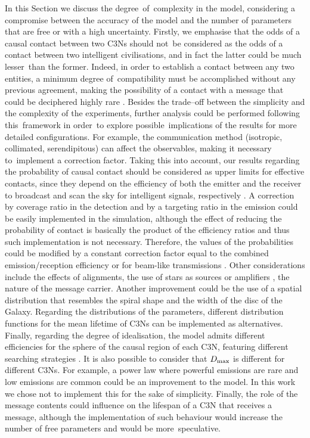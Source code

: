 \documentclass[crop]{CSLB}
\newcommand{\ceti}{C3N}
\newcommand{\cetis}{C3Ns}
\begin{document}
In this Section we discuss the degree of complexity in the model, considering a compromise between the accuracy of the
model and the number of parameters that are free or with a high uncertainty.
%
Firstly, we emphasise that the odds of a causal contact between two \cetis{} should not be considered as the odds of a
contact between two intelligent civilisations, and in fact the latter could be much lesser than the former.
%
Indeed, in order to establish a contact between any two entities, a minimum degree of compatibility must be accomplished
without any previous agreement, making the possibility of a contact with a message that could be deciphered highly rare
\citep[see e.g. ][]{forgan_collimated_2014}.
%
Besides the trade--off between the simplicity and the complexity of the experiments, further analysis could be performed
following this framework in order to explore possible implications of the results for more detailed configurations.
%
For example, the communication method (isotropic, collimated, serendipitous) can affect the observables, making it
necessary to implement a correction factor.
%
Taking this into account, our results regarding the probability of causal contact should be considered as upper limits
for effective contacts, since they depend on the efficiency of both the emitter and the receiver to broadcast and scan
the sky for intelligent signals, respectively \citep{grimaldi_signal_2017}.
%
A correction by coverage ratio in the detection and by a targeting ratio in the emission could be easily implemented in
the simulation, although the effect of reducing the probability of contact is basically the product of the efficiency
ratios and thus such implementation is not necessary.
%
Therefore, the values of the probabilities could be modified by a constant correction factor equal to the combined
emission/reception efficiency \citep{smith_broadcasting_2009, anchordoqui_upper_2019, forgan_collimated_2014} or for
beam-like transmissions \citep{grimaldi_signal_2017}. 
%
Other considerations include the effects of alignments, the use of stars as sources or amplifiers \citep{Edmondson2003,
borra_searching_2012}, the nature of the message carrier.
%
Another improvement could be the use of a spatial distribution that resembles the spiral shape and the width of the disc
of the Galaxy.
%
Regarding the distributions of the parameters, different distribution functions for the mean lifetime of \cetis{} can be
implemented as alternatives.
%
Finally, regarding the degree of idealisation, the model admits different efficiencies for the sphere of the causal
region of each \ceti{}, featuring different searching strategies \citep{hippke_interstellar_2017}. 
%
It is also possible to consider that $D_{\rm max}$ is different for different \cetis{}.
%
For example, a power law where powerful emissions are rare and low emissions are common could be an improvement to the
model.
%
In this work we chose not to implement this for the sake of simplicity.
%
Finally, the role of the message contents could influence on the lifespan of a \ceti{} that receives a message, although
the implementation of such behaviour would increase the number of free parameters and would be more speculative.     
\end{document}
